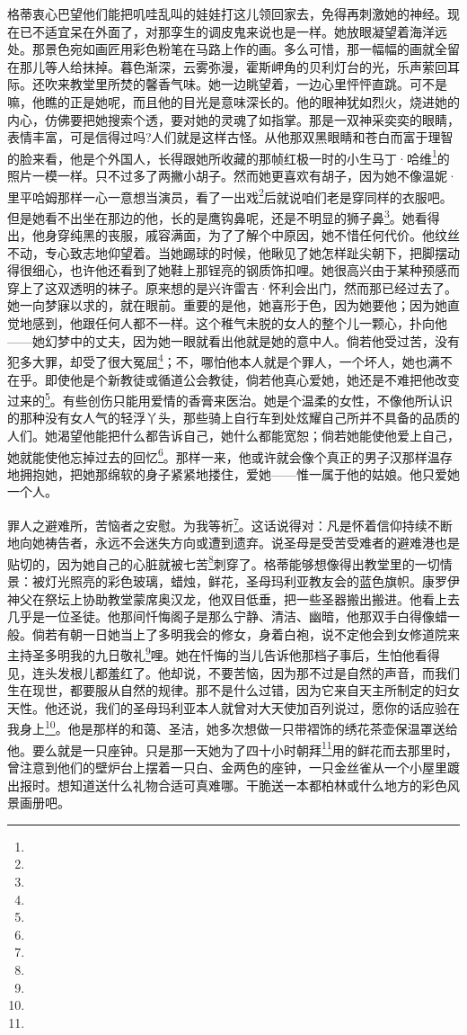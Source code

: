 \par 格蒂衷心巴望他们能把叽哇乱叫的娃娃打这儿领回家去，免得再刺激她的神经。现在已不适宜呆在外面了，对那孪生的调皮鬼来说也是一样。她放眼凝望着海洋远处。那景色宛如画匠用彩色粉笔在马路上作的画。多么可惜，那一幅幅的画就全留在那儿等人给抹掉。暮色渐深，云雾弥漫，霍斯岬角的贝利灯台的光，乐声萦回耳际。还吹来教堂里所焚的馨香气味。她一边眺望着，一边心里怦怦直跳。可不是嘛，他瞧的正是她呢，而且他的目光是意味深长的。他的眼神犹如烈火，烧进她的内心，仿佛要把她搜索个透，要对她的灵魂了如指掌。那是一双神采奕奕的眼睛，表情丰富，可是信得过吗?人们就是这样古怪。从他那双黑眼睛和苍白而富于理智的脸来看，他是个外国人，长得跟她所收藏的那帧红极一时的小生马丁·哈维\footnote{}的照片一模一样。只不过多了两撇小胡子。然而她更喜欢有胡子，因为她不像温妮·里平哈姆那样一心一意想当演员，看了一出戏\footnote{}后就说咱们老是穿同样的衣服吧。但是她看不出坐在那边的他，长的是鹰钩鼻呢，还是不明显的狮子鼻\footnote{}。她看得出，他身穿纯黑的丧服，戚容满面，为了了解个中原因，她不惜任何代价。他纹丝不动，专心致志地仰望着。当她踢球的时候，他瞅见了她怎样趾尖朝下，把脚摆动得很细心，也许他还看到了她鞋上那锃亮的钢质饰扣哩。她很高兴由于某种预感而穿上了这双透明的袜子。原来想的是兴许雷吉·怀利会出门，然而那已经过去了。她一向梦寐以求的，就在眼前。重要的是他，她喜形于色，因为她要他；因为她直觉地感到，他跟任何人都不一样。这个稚气未脱的女人的整个儿一颗心，扑向他——她幻梦中的丈夫，因为她一眼就看出他就是她的意中人。倘若他受过苦，没有犯多大罪，却受了很大冤屈\footnote{}；不，哪怕他本人就是个罪人，一个坏人，她也满不在乎。即使他是个新教徒或循道公会教徒，倘若他真心爱她，她还是不难把他改变过来的\footnote{}。有些创伤只能用爱情的香膏来医治。她是个温柔的女性，不像他所认识的那种没有女人气的轻浮丫头，那些骑上自行车到处炫耀自己所并不具备的品质的人们。她渴望他能把什么都告诉自己，她什么都能宽恕；倘若她能使他爱上自己，她就能使他忘掉过去的回忆\footnote{}。那样一来，他或许就会像个真正的男子汉那样温存地拥抱她，把她那绵软的身子紧紧地搂住，爱她——惟一属于他的姑娘。他只爱她一个人。
\par 罪人之避难所，苦恼者之安慰。为我等祈\footnote{}。这话说得对：凡是怀着信仰持续不断地向她祷告者，永远不会迷失方向或遭到遗弃。说圣母是受苦受难者的避难港也是贴切的，因为她自己的心脏就被七苦\footnote{}刺穿了。格蒂能够想像得出教堂里的一切情景：被灯光照亮的彩色玻璃，蜡烛，鲜花，圣母玛利亚教友会的蓝色旗帜。康罗伊神父在祭坛上协助教堂蒙席奥汉龙，他双目低垂，把一些圣器搬出搬进。他看上去几乎是一位圣徒。他那间忏悔阁子是那么宁静、清洁、幽暗，他那双手白得像蜡一般。倘若有朝一日她当上了多明我会的修女，身着白袍，说不定他会到女修道院来主持圣多明我的九日敬礼\footnote{}哩。她在忏悔的当儿告诉他那档子事后，生怕他看得见，连头发根儿都羞红了。他却说，不要苦恼，因为那不过是自然的声音，而我们生在现世，都要服从自然的规律。那不是什么过错，因为它来自天主所制定的妇女天性。他还说，我们的圣母玛利亚本人就曾对大天使加百列说过，愿你的话应验在我身上\footnote{}。他是那样的和蔼、圣洁，她多次想做一只带褶饰的绣花茶壶保温罩送给他。要么就是一只座钟。只是那一天她为了四十小时朝拜\footnote{}用的鲜花而去那里时，曾注意到他们的壁炉台上摆着一只白、金两色的座钟，一只金丝雀从一个小屋里踱出报时。想知道送什么礼物合适可真难哪。干脆送一本都柏林或什么地方的彩色风景画册吧。
